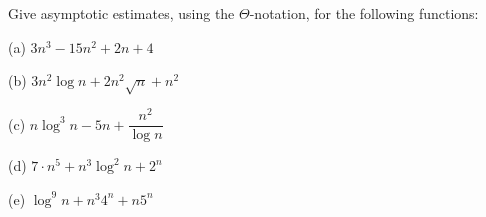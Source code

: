 \documentclass[11pt]{article}
\begin{document}
\newpage

\begin{problem}
 	Give asymptotic estimates, using the $\Theta$-notation, for the following functions:
%
\begin{description}\setlength{\itemsep}{-0.01in}
%
\item{(a)} $3n^3 - 15n^2 + 2n + 4$
\item{(b)} $3n^2\log n +  2n^2\sqrt{n} + n^2$
\item{(c)} $n\log^3n -5 n + \dfrac{n^2}{\log n}$
\item{(d)} $7 \cdot n^5 + n^3 \log^2 n + 2^n$
\item{(e)} $\log^{9}n + n^3 4^n + n 5^n$
%
\end{description}

\end{problem}

\end{document}
